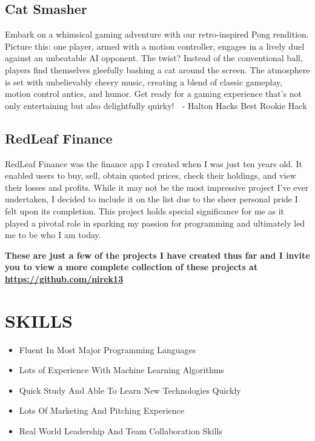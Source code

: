 \documentclass[a4paper,10pt]{article}
\begin{document}
\subsection*{Cat Smasher}
Embark on a whimsical gaming adventure with our retro-inspired Pong rendition. Picture this: one player, armed with a motion controller, engages in a lively duel against an unbeatable AI opponent. The twist? Instead of the conventional ball, players find themselves gleefully bashing a cat around the screen. The atmosphere is set with unbelievably cheery music, creating a blend of classic gameplay, motion control antics, and humor. Get ready for a gaming experience that's not only entertaining but also delightfully quirky! 🥇 - Halton Hacks Best Rookie Hack

\subsection*{RedLeaf Finance}
RedLeaf Finance was the finance app I created when I was just ten years old. It enabled users to buy, sell, obtain quoted prices, check their holdings, and view their losses and profits. While it may not be the most impressive project I've ever undertaken, I decided to include it on the list due to the sheer personal pride I felt upon its completion. This project holds special significance for me as it played a pivotal role in sparking my passion for programming and ultimately led me to be who I am today.

\textbf{These are just a few of the projects I have created thus far and I invite you to view a more complete collection of these projects at \href{https://github.com/nirek13}{https://github.com/nirek13}}

\section*{SKILLS}
\begin{itemize}[leftmargin=*]
    \item Fluent In Most Major Programming Languages
    \item Lots of Experience With Machine Learning Algorithms
    \item Quick Study And Able To Learn New Technologies Quickly
    \item Lots Of Marketing And Pitching Experience
    \item Real World Leadership And Team Collaboration Skills
\end{itemize}
\end{document}

